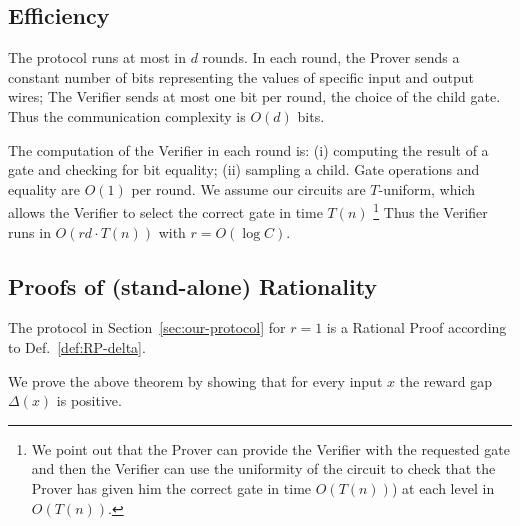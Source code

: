 \subsection{Efficiency} 
The protocol runs at most in $d$ rounds.
In each round, the Prover sends a constant number of bits representing the values 
of specific input and output wires; The Verifier sends at most one bit per round, 
the choice of the child gate. Thus the communication complexity is $O(d)$ bits.

The computation of the Verifier in each round is: (i) computing the result of a gate 
and checking for bit equality; (ii) sampling a child.
Gate operations and equality are $O(1)$ per round.
We assume our circuits are $T$-uniform, which allows the Verifier to select the correct gate in time $T(n)$ \footnote{
We point out that the Prover can provide the Verifier with the requested gate and then the Verifier can use the uniformity of the circuit to check that the Prover has given him the correct gate in time $O(T(n))$) at each level in $O(T(n))$. }
Thus the Verifier runs in $O(r d\cdot T(n))$ with $r=O(\log C)$.



\subsection{Proofs of (stand-alone) Rationality}
\label{sec:proof-stand-alone}

\begin{theorem}
\label{thm:rp}
The protocol in Section~\ref{sec:our-protocol} for $r=1$ is a Rational Proof according to Def.~\ref{def:RP-delta}.
\end{theorem}
We prove the above theorem by showing that for every input $x$ the reward gap $\Delta(x)$ is positive. 

